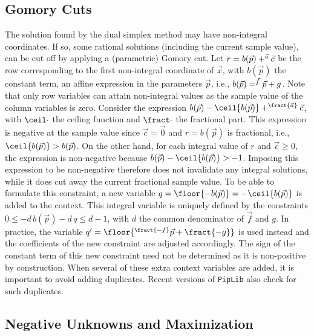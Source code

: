 \subsection{Gomory Cuts}

The solution found by the dual simplex method may have
non-integral coordinates.  If so, some rational solutions
(including the current sample value), can be cut off by
applying a (parametric) Gomory cut.
Let $r = b(\vec p) + \sp {\vec a} {\vec c}$ be the row
corresponding to the first non-integral coordinate of $\vec x$,
with $b(\vec p)$ the constant term, an affine expression in the
parameters $\vec p$, i.e., $b(\vec p) = \sp {\vec f} {\vec p} + g$.
Note that only row variables can attain
non-integral values as the sample value of the column variables is zero.
Consider the expression
$b(\vec p) - \ceil{b(\vec p)} + \sp {\fract{\vec a}} {\vec c}$,
with $\ceil\cdot$ the ceiling function and $\fract\cdot$ the
fractional part.  This expression is negative at the sample value
since $\vec c = \vec 0$ and $r = b(\vec p)$ is fractional, i.e.,
$\ceil{b(\vec p)} > b(\vec p)$.  On the other hand, for each integral
value of $r$ and $\vec c \ge 0$, the expression is non-negative
because $b(\vec p) - \ceil{b(\vec p)} > -1$.
Imposing this expression to be non-negative therefore does not
invalidate any integral solutions, while it does cut away the current
fractional sample value.  To be able to formulate this constraint,
a new variable $q = \floor{-b(\vec p)} = - \ceil{b(\vec p)}$ is added
to the context.  This integral variable is uniquely defined by the constraints
$0 \le -d \, b(\vec p) - d \, q \le d - 1$, with $d$ the common
denominator of $\vec f$ and $g$.  In practice, the variable
$q' = \floor{\sp {\fract{-f}} {\vec p} + \fract{-g}}$ is used instead
and the coefficients of the new constraint are adjusted accordingly.
The sign of the constant term of this new constraint need not be determined
as it is non-positive by construction.
When several of these extra context variables are added, it is important
to avoid adding duplicates.
Recent versions of {\tt PipLib} also check for such duplicates.

\subsection{Negative Unknowns and Maximization}

